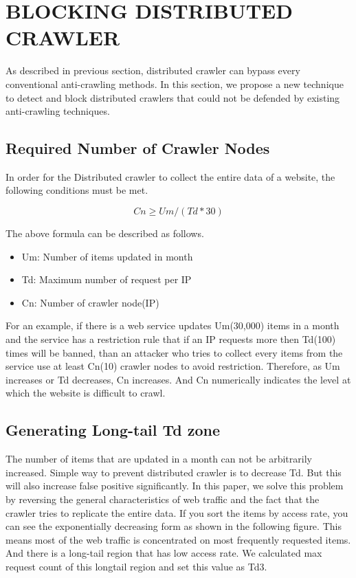 \documentclass[sigconf,anonymous=true]{acmart}
\begin{document}
%
%
\section{BLOCKING DISTRIBUTED CRAWLER}
As described in previous section, distributed crawler can bypass every conventional anti-crawling methods. In this section, we propose a new technique to detect and block distributed crawlers that could not be defended by existing anti-crawling techniques.

\subsection{Required Number of Crawler Nodes}
In order for the Distributed crawler to collect the entire data of a website, the following conditions must be met.

\begin{displaymath}
Cn \geq Um / (Td * 30) 
\end{displaymath}

The above formula can be described as follows.

\begin{itemize}
\item Um: Number of items updated in month
\item Td: Maximum number of request per IP
\item Cn: Number of crawler node(IP)
\end{itemize}

For an example, if there is a web service updates Um(30,000) items in a month and the service has a restriction rule that if an IP requests more then Td(100) times will be banned, than an attacker who tries to collect every items from the service use at least Cn(10) crawler nodes to avoid restriction.
Therefore, as Um increases or Td decreases, Cn increases. And Cn numerically indicates the level at which the website is difficult to crawl.

\subsection{Generating Long-tail Td zone}
The number of items that are updated in a month can not be arbitrarily increased. Simple way to prevent distributed crawler is to decrease Td. But this will also increase false positive significantly. In this paper, we solve this problem by reversing the general characteristics of web traffic and the fact that the crawler tries to replicate the entire data.
If you sort the items by access rate, you can see the exponentially decreasing form as shown in the following figure. This means most of the web traffic is concentrated on most frequently requested items. And there is a long-tail region that has low access rate. We calculated max request count of this longtail region and set this value as Td3.
\end{document}
